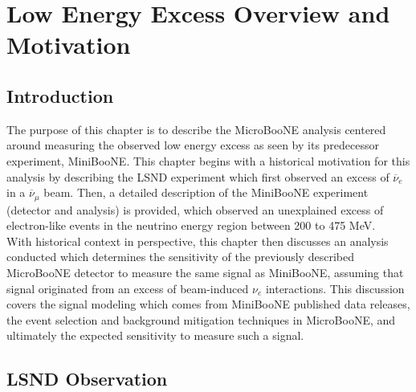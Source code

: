 \section{Low Energy Excess Overview and Motivation}
\subsection{Introduction}
The purpose of this chapter is to describe the MicroBooNE analysis centered around measuring the observed low energy excess as seen by its predecessor experiment, MiniBooNE. This chapter begins with a historical motivation for this analysis by describing the LSND experiment which first observed an excess of $\overline{\nu}_e$ in a $\overline{\nu}_\mu$ beam. Then, a detailed description of the MiniBooNE experiment (detector and analysis) is provided, which observed an unexplained excess of electron-like events in the neutrino energy region between 200 to 475 MeV.\\

With historical context in perspective, this chapter then discusses an analysis conducted which determines the sensitivity of the previously described MicroBooNE detector to measure the same signal as MiniBooNE, assuming that signal originated from an excess of beam-induced $\nu_e$ interactions. This discussion covers the signal modeling which comes from MiniBooNE published data releases, the event selection and background mitigation techniques in MicroBooNE, and ultimately the expected sensitivity to measure such a signal.

\subsection{LSND Observation}

